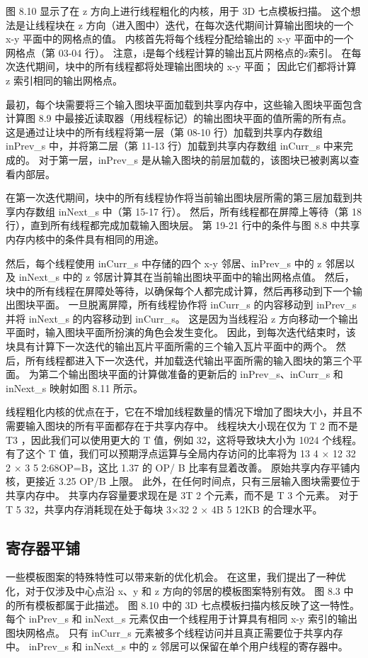 图 8.10 显示了在 z 方向上进行线程粗化的内核，用于 3D 七点模板扫描。 这个想法是让线程块在 z 方向（进入图中）迭代，在每次迭代期间计算输出图块的一个 x-y 平面中的网格点的值。 内核首先将每个线程分配给输出的 x-y 平面中的一个网格点（第 03-04 行）。 注意，i是每个线程计算的输出瓦片网格点的z索引。 在每次迭代期间，块中的所有线程都将处理输出图块的 x-y 平面； 因此它们都将计算 z 索引相同的输出网格点。

最初，每个块需要将三个输入图块平面加载到共享内存中，这些输入图块平面包含计算图 8.9 中最接近读取器（用线程标记）的输出图块平面的值所需的所有点。 这是通过让块中的所有线程将第一层（第 08-10 行）加载到共享内存数组 inPrev\_s 中，并将第二层（第 11-13 行）加载到共享内存数组 inCurr\_s 中来完成的。 对于第一层，inPrev\_s 是从输入图块的前层加载的，该图块已被剥离以查看内部层。

在第一次迭代期间，块中的所有线程协作将当前输出图块层所需的第三层加载到共享内存数组 inNext\_s 中（第 15-17 行）。 然后，所有线程都在屏障上等待（第 18 行），直到所有线程都完成加载输入图块层。 第 19-21 行中的条件与图 8.8 中共享内存内核中的条件具有相同的用途。

然后，每个线程使用 inCurr\_s 中存储的四个 x-y 邻居、inPrev\_s 中的 z 邻居以及 inNext\_s 中的 z 邻居计算其在当前输出图块平面中的输出网格点值。 然后，块中的所有线程在屏障处等待，以确保每个人都完成计算，然后再移动到下一个输出图块平面。 一旦脱离屏障，所有线程协作将 inCurr\_s 的内容移动到 inPrev\_s 并将 inNext\_s 的内容移动到 inCurr\_s。 这是因为当线程沿 z 方向移动一个输出平面时，输入图块平面所扮演的角色会发生变化。 因此，到每次迭代结束时，该块具有计算下一次迭代的输出瓦片平面所需的三个输入瓦片平面中的两个。 然后，所有线程都进入下一次迭代，并加载迭代输出平面所需的输入图块的第三个平面。 为第二个输出图块平面的计算做准备的更新后的 inPrev\_s、inCurr\_s 和 inNext\_s 映射如图 8.11 所示。

线程粗化内核的优点在于，它在不增加线程数量的情况下增加了图块大小，并且不需要输入图块的所有平面都存在于共享内存中。 线程块大小现在仅为 T 2 而不是 T3 ，因此我们可以使用更大的 T 值，例如 32，这将导致块大小为 1024 个线程。 有了这个 T 值，我们可以预期浮点运算与全局内存访问的比率将为 13 4 × 12 32 2 × 3 5 2:68OP=B，这比 1.37 的 OP/ B 比率有显着改善。 原始共享内存平铺内核，更接近 3.25 OP/B 上限。 此外，在任何时间点，只有三层输入图块需要位于共享内存中。 共享内存容量要求现在是 3T 2 个元素，而不是 T 3 个元素。 对于 T 5 32，共享内存消耗现在处于每块 3×32 2 × 4B 5 12KB 的合理水平。

\subsection{寄存器平铺}
一些模板图案的特殊特性可以带来新的优化机会。 在这里，我们提出了一种优化，对于仅涉及中心点沿 x、y 和 z 方向的邻居的模板图案特别有效。 图 8.3 中的所有模板都属于此描述。 图 8.10 中的 3D 七点模板扫描内核反映了这一特性。 每个 inPrev\_s 和 inNext\_s 元素仅由一个线程用于计算具有相同 x-y 索引的输出图块网格点。 只有 inCurr\_s 元素被多个线程访问并且真正需要位于共享内存中。 inPrev\_s 和 inNext\_s 中的 z 邻居可以保留在单个用户线程的寄存器中。

